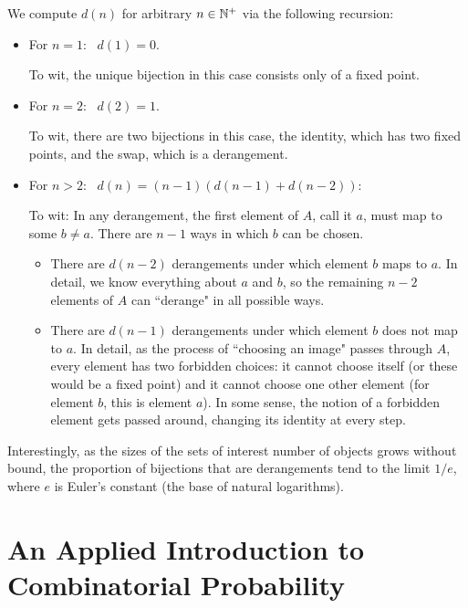 We compute $d(n)$ for arbitrary $n \in \mathbb{N}^+$ via the following recursion:
\begin{itemize}
\item
For $n=1$:  \ $d(1) = 0$.

To wit, the unique bijection in this case consists only of a fixed point. 

\item
For $n=2$:  \ $d(2) = 1$.

To wit, there are two bijections in this case, the identity, which has two fixed points, and the swap,
which is a derangement.

\item
For $n > 2$: \ $d(n) = (n-1) (d(n-1) + d(n-2))$:

To wit: In any derangement, the first element of $A$, call it $a$, must map to some $b \neq a$.  There
are $n-1$ ways in which $b$ can be chosen.

\begin{itemize}
\item
There are $d(n-2)$ derangements under which element $b$ maps to $a$.  In detail, we know
everything about $a$ and $b$, so the remaining $n-2$ elements of $A$ can ``derange" in all
possible ways.

\item
There are $d(n-1)$ derangements under which element $b$ does not map to $a$.  In detail,
as the process of ``choosing an image" passes through $A$, every element has two forbidden
choices: it cannot choose itself (or these would be a fixed point) and it cannot choose one other
element (for element $b$, this is element $a$).  In some sense, the notion of a
forbidden element gets passed around, changing its identity at every step.
\end{itemize}
\end{itemize}

\medskip

Interestingly, as the sizes of the sets of interest number of objects grows without bound, the
proportion of bijections that are derangements tend to the limit $1/e$, where $e$ is Euler's
constant (the base of natural logarithms).



\section{An Applied Introduction to Combinatorial Probability}
\label{sec:combinatorial-prob}

